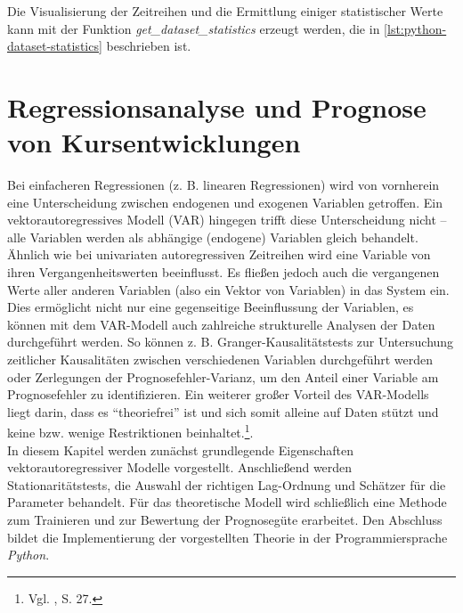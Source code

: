 \documentclass[
	a4paper,
	12pt,
	bibliography=totocnumbered,
	twoside,
]{scrreprt}
\begin{document}
Die Visualisierung der Zeitreihen und die Ermittlung einiger statistischer Werte kann mit der Funktion \textit{get\_dataset\_statistics} erzeugt werden, die in \ref{lst:python-dataset-statistics} beschrieben ist.




\chapter{Regressionsanalyse und Prognose von Kursentwicklungen}
Bei einfacheren Regressionen (z. B. linearen Regressionen) wird von vornherein eine Unterscheidung zwischen endogenen und exogenen Variablen getroffen. Ein vektorautoregressives Modell (VAR) hingegen trifft diese Unterscheidung nicht -- alle Variablen werden als abhängige (endogene) Variablen gleich behandelt.
Ähnlich wie bei univariaten autoregressiven Zeitreihen wird eine Variable von ihren Vergangenheitswerten beeinflusst.
Es fließen jedoch auch die vergangenen Werte aller anderen Variablen (also ein Vektor von Variablen) in das System ein.
Dies ermöglicht nicht nur eine gegenseitige Beeinflussung der Variablen, es können mit dem VAR-Modell auch zahlreiche strukturelle Analysen der Daten durchgeführt werden.
So können z. B. Gran\-ger-Kau\-sa\-li\-täts\-tests zur Untersuchung zeitlicher Kausalitäten zwischen verschiedenen Variablen durchgeführt werden oder Zerlegungen der Prognosefehler-Varianz, um den Anteil einer Variable am Prognosefehler zu identifizieren.
Ein weiterer großer Vorteil des VAR-Modells liegt darin, dass es "`theoriefrei"' ist und sich somit alleine auf Daten stützt und keine bzw. wenige Restriktionen beinhaltet.\footnote{Vgl. \citet{sims1980}, S. 27.}.\\

In diesem Kapitel werden zunächst grundlegende Eigenschaften vektorautoregressiver Modelle vorgestellt. Anschließend werden Stationaritätstests, die Auswahl der richtigen Lag-Ordnung und Schätzer für die Parameter behandelt. Für das theoretische Modell wird schließlich eine Methode zum Trainieren und zur Bewertung der Prognosegüte erarbeitet. Den Abschluss bildet die Implementierung der vorgestellten Theorie in der Programmiersprache \textit{Python}.
\end{document}
